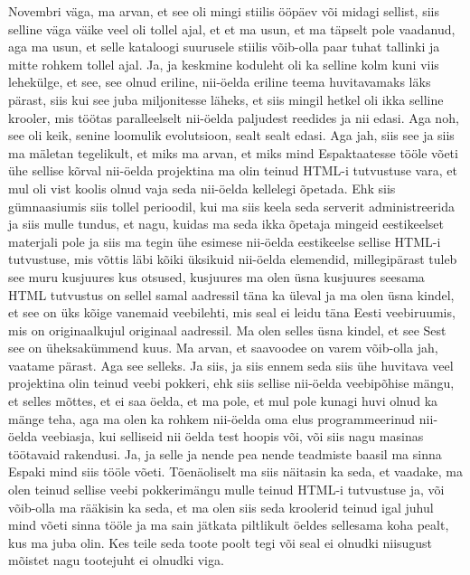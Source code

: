 Novembri väga, ma arvan, et see oli mingi stiilis ööpäev või midagi sellist, siis selline väga väike veel oli tollel ajal, et et ma usun, et ma täpselt pole vaadanud, aga ma usun, et selle kataloogi suurusele stiilis võib-olla paar tuhat tallinki ja mitte rohkem tollel ajal. Ja, ja keskmine koduleht oli ka selline kolm kuni viis lehekülge, et see, see olnud eriline, nii-öelda eriline teema huvitavamaks läks pärast, siis kui see juba miljonitesse läheks, et siis mingil hetkel oli ikka selline krooler, mis töötas paralleelselt nii-öelda paljudest reedides ja nii edasi. Aga noh, see oli keik, senine loomulik evolutsioon, sealt sealt edasi. Aga jah, siis see ja siis ma mäletan tegelikult, et miks ma arvan, et miks mind Espaktaatesse tööle võeti ühe sellise kõrval nii-öelda projektina ma olin teinud HTML-i tutvustuse vara, et mul oli vist koolis olnud vaja seda nii-öelda kellelegi õpetada. Ehk siis gümnaasiumis siis tollel perioodil, kui ma siis keela seda serverit administreerida ja siis mulle tundus, et nagu, kuidas ma seda ikka õpetaja mingeid eestikeelset materjali pole ja siis ma tegin ühe esimese nii-öelda eestikeelse sellise HTML-i tutvustuse, mis võttis läbi kõiki üksikuid nii-öelda elemendid, millegipärast tuleb see muru kusjuures kus otsused, kusjuures ma olen üsna kusjuures seesama HTML tutvustus on sellel samal aadressil täna ka üleval ja ma olen üsna kindel, et see on üks kõige vanemaid veebilehti, mis seal ei leidu täna Eesti veebiruumis, mis on originaalkujul originaal aadressil. Ma olen selles üsna kindel, et see
Sest see on üheksakümmend kuus.
Ma arvan, et saavoodee on varem võib-olla jah, vaatame pärast. Aga see selleks.
Ja siis, ja siis ennem seda siis ühe huvitava veel projektina olin teinud veebi pokkeri, ehk siis sellise nii-öelda veebipõhise mängu, et selles mõttes, et ei saa öelda, et ma pole, et mul pole kunagi huvi olnud ka mänge teha, aga ma olen ka rohkem nii-öelda oma elus programmeerinud nii-öelda veebiasja, kui selliseid nii öelda test hoopis või, või siis nagu masinas töötavaid rakendusi. Ja, ja selle ja nende pea nende teadmiste baasil ma sinna Espaki mind siis tööle võeti. Tõenäoliselt ma siis näitasin ka seda, et vaadake, ma olen teinud sellise veebi pokkerimängu mulle teinud HTML-i tutvustuse ja, või võib-olla ma rääkisin ka seda, et ma olen siis seda kroolerid teinud igal juhul mind võeti sinna tööle ja ma sain jätkata piltlikult öeldes sellesama koha pealt, kus ma juba olin.
Kes teile seda toote poolt tegi või seal ei olnudki niisugust mõistet nagu tootejuht ei olnudki viga.
